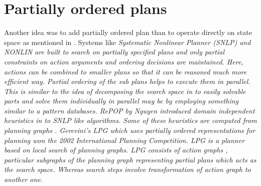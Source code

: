 \documentclass[12pt]{article}
\begin{document}
\section{Partially ordered plans}
Another idea was to add partially ordered plan than to operate directly on state space as mentioned in \cite{Norvig09}. Systems like \em Systematic Nonlinear Planner (SNLP)  \em \cite{McARos91a} and NONLIN \cite{Tate76} are built to search  on partially specified plans and only partial constraints on action arguments and ordering decisions are maintained. Here, actions can be combined to smaller plans so that it can be reasoned much more efficient way. Partial ordering of the sub plans helps to execute them in parallel. This is similar to the idea of decomposing the search space in to easily solvable parts and solve them individually in parallel may be by employing something similar to a pattern databases. RePOP by Nguyen \cite{Nguyen01} introduced domain independent heuristics in to SNLP like algorithms. Some of these heuristics are computed from planning graphs \cite{blum95}. Gerevini's LPG \cite{GereviniS02} which uses partially ordered representations for planning won the 2002 International Planning Competition. LPG is a planner based on local search of planning graphs. LPG consists of \em action graphs \em, particular subgraphs of the planning graph representing partial plans which acts as the search space. Whereas search steps involve transformation of action graph to another one.



{} 

\end{document}
